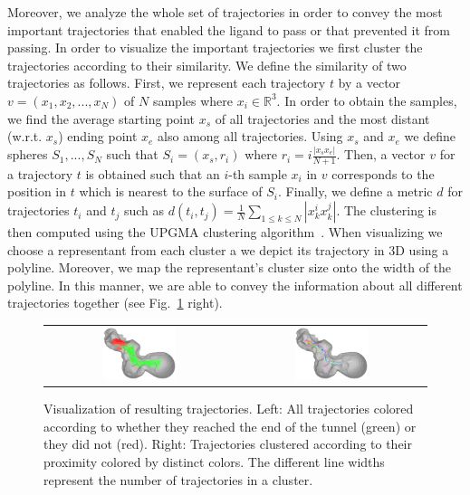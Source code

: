\documentclass{svmult}
\begin{document}
Moreover, we analyze the whole set of trajectories in order to convey the most important trajectories that enabled the ligand to pass or that prevented it from passing.
In order to visualize the important trajectories we first cluster the trajectories according to their similarity.
We define the similarity of two trajectories as follows.
First, we represent each trajectory $t$ by a vector $v = (x_1, x_2, ..., x_N)$ of $N$ samples where $x_i \in \mathbb{R}^3$.
In order to obtain the samples, we find the average starting point $x_s$ of all trajectories and the most distant (w.r.t. $x_s$) ending point $x_e$ also among all trajectories.
Using $x_s$ and $x_e$ we define spheres $S_1, ..., S_N$ such that $S_i = (x_s, r_i)$ where $r_i = i \frac{|x_s x_e|}{N + 1}$.
Then, a vector $v$ for a trajectory $t$ is obtained such that an $i$-th sample $x_i$ in $v$ corresponds to the position in $t$ which is nearest to the surface of $S_i$.
Finally, we define a metric $d$ for trajectories $t_i$ and $t_j$ such as $d(t_i, t_j) = \frac{1}{N} \sum_{1 \leq k \leq N} |x_k^i x_k^j|$.
The clustering is then computed using the UPGMA clustering algorithm~\cite{sokal1958statistical}.
When visualizing we choose a representant from each cluster a we depict its trajectory in 3D using a polyline.
Moreover, we map the representant's cluster size onto the width of the polyline.
In this manner, we are able to convey the information about all different trajectories together (see Fig.~\ref{fig:trajectories} right).

\begin{figure}
\centering
\begin{tabular}{cc}
\includegraphics[width=0.4\textwidth]{fig/trajectories-all}
\qquad & \qquad
\includegraphics[width=0.4\textwidth]{fig/trajectories-clustered-21} \\
\end{tabular}
\caption{Visualization of resulting trajectories.
Left: All trajectories colored according to whether they reached the end of the tunnel (green) or they did not (red).
Right: Trajectories clustered according to their proximity colored by distinct colors.
The different line widths represent the number of trajectories in a cluster.}
\label{fig:trajectories}
\end{figure}
\end{document}
